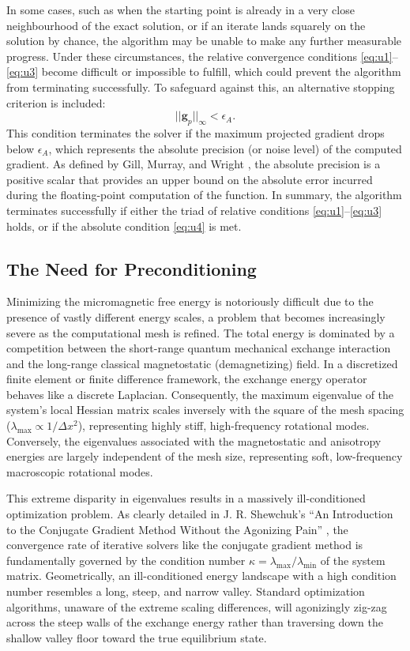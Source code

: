 \documentclass[10pt, a4paper, twocolumn]{article}
\begin{document}
In some cases, such as when the starting point is already in a very close neighbourhood of the exact solution, or if an iterate lands squarely on the solution by chance, the algorithm may be unable to make any further measurable progress. Under these circumstances, the relative convergence conditions \eqref{eq:u1}--\eqref{eq:u3} become difficult or impossible to fulfill, which could prevent the algorithm from terminating successfully. To safeguard against this, an alternative stopping criterion is included:
\begin{equation}
    || \mathbf{g}_p ||_\infty < \epsilon_A. \label{eq:u4}
\end{equation}
This condition terminates the solver if the maximum projected gradient drops below $\epsilon_A$, which represents the absolute precision (or noise level) of the computed gradient. As defined by Gill, Murray, and Wright \cite[Section 2.1.6]{GillMurray1981}, the absolute precision is a positive scalar that provides an upper bound on the absolute error incurred during the floating-point computation of the function. In summary, the algorithm terminates successfully if either the triad of relative conditions \eqref{eq:u1}--\eqref{eq:u3} holds, or if the absolute condition \eqref{eq:u4} is met.

\subsection{The Need for Preconditioning}
Minimizing the micromagnetic free energy is notoriously difficult due to the presence of vastly different energy scales, a problem that becomes increasingly severe as the computational mesh is refined. The total energy is dominated by a competition between the short-range quantum mechanical exchange interaction and the long-range classical magnetostatic (demagnetizing) field. In a discretized finite element or finite difference framework, the exchange energy operator behaves like a discrete Laplacian. Consequently, the maximum eigenvalue of the system's local Hessian matrix scales inversely with the square of the mesh spacing ($\lambda_{\max} \propto 1/\Delta x^2$), representing highly stiff, high-frequency rotational modes. Conversely, the eigenvalues associated with the magnetostatic and anisotropy energies are largely independent of the mesh size, representing soft, low-frequency macroscopic rotational modes. 

This extreme disparity in eigenvalues results in a massively ill-conditioned optimization problem. As clearly detailed in J. R. Shewchuk's ``An Introduction to the Conjugate Gradient Method Without the Agonizing Pain'' \cite{Shewchuk1994}, the convergence rate of iterative solvers like the conjugate gradient method is fundamentally governed by the condition number $\kappa = \lambda_{\max}/\lambda_{\min}$ of the system matrix. Geometrically, an ill-conditioned energy landscape with a high condition number resembles a long, steep, and narrow valley. Standard optimization algorithms, unaware of the extreme scaling differences, will agonizingly zig-zag across the steep walls of the exchange energy rather than traversing down the shallow valley floor toward the true equilibrium state.
\end{document}
